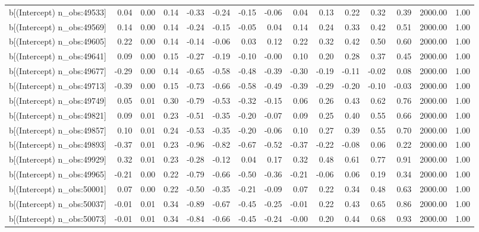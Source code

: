 \begin{table}[ht]
\begin{tabular}{rrrrrrrrrrrrrrr}
  b[(Intercept) n\_obs:49533] & 0.04 & 0.00 & 0.14 & -0.33 & -0.24 & -0.15 & -0.06 & 0.04 & 0.13 & 0.22 & 0.32 & 0.39 & 2000.00 & 1.00 \\ 
  b[(Intercept) n\_obs:49569] & 0.14 & 0.00 & 0.14 & -0.24 & -0.15 & -0.05 & 0.04 & 0.14 & 0.24 & 0.33 & 0.42 & 0.51 & 2000.00 & 1.00 \\ 
  b[(Intercept) n\_obs:49605] & 0.22 & 0.00 & 0.14 & -0.14 & -0.06 & 0.03 & 0.12 & 0.22 & 0.32 & 0.42 & 0.50 & 0.60 & 2000.00 & 1.00 \\ 
  b[(Intercept) n\_obs:49641] & 0.09 & 0.00 & 0.15 & -0.27 & -0.19 & -0.10 & -0.00 & 0.10 & 0.20 & 0.28 & 0.37 & 0.45 & 2000.00 & 1.00 \\ 
  b[(Intercept) n\_obs:49677] & -0.29 & 0.00 & 0.14 & -0.65 & -0.58 & -0.48 & -0.39 & -0.30 & -0.19 & -0.11 & -0.02 & 0.08 & 2000.00 & 1.00 \\ 
  b[(Intercept) n\_obs:49713] & -0.39 & 0.00 & 0.15 & -0.73 & -0.66 & -0.58 & -0.49 & -0.39 & -0.29 & -0.20 & -0.10 & -0.03 & 2000.00 & 1.00 \\ 
  b[(Intercept) n\_obs:49749] & 0.05 & 0.01 & 0.30 & -0.79 & -0.53 & -0.32 & -0.15 & 0.06 & 0.26 & 0.43 & 0.62 & 0.76 & 2000.00 & 1.00 \\ 
  b[(Intercept) n\_obs:49821] & 0.09 & 0.01 & 0.23 & -0.51 & -0.35 & -0.20 & -0.07 & 0.09 & 0.25 & 0.40 & 0.55 & 0.66 & 2000.00 & 1.00 \\ 
  b[(Intercept) n\_obs:49857] & 0.10 & 0.01 & 0.24 & -0.53 & -0.35 & -0.20 & -0.06 & 0.10 & 0.27 & 0.39 & 0.55 & 0.70 & 2000.00 & 1.00 \\ 
  b[(Intercept) n\_obs:49893] & -0.37 & 0.01 & 0.23 & -0.96 & -0.82 & -0.67 & -0.52 & -0.37 & -0.22 & -0.08 & 0.06 & 0.22 & 2000.00 & 1.00 \\ 
  b[(Intercept) n\_obs:49929] & 0.32 & 0.01 & 0.23 & -0.28 & -0.12 & 0.04 & 0.17 & 0.32 & 0.48 & 0.61 & 0.77 & 0.91 & 2000.00 & 1.00 \\ 
  b[(Intercept) n\_obs:49965] & -0.21 & 0.00 & 0.22 & -0.79 & -0.66 & -0.50 & -0.36 & -0.21 & -0.06 & 0.06 & 0.19 & 0.34 & 2000.00 & 1.00 \\ 
  b[(Intercept) n\_obs:50001] & 0.07 & 0.00 & 0.22 & -0.50 & -0.35 & -0.21 & -0.09 & 0.07 & 0.22 & 0.34 & 0.48 & 0.63 & 2000.00 & 1.00 \\ 
  b[(Intercept) n\_obs:50037] & -0.01 & 0.01 & 0.34 & -0.89 & -0.67 & -0.45 & -0.25 & -0.01 & 0.22 & 0.43 & 0.65 & 0.86 & 2000.00 & 1.00 \\ 
  b[(Intercept) n\_obs:50073] & -0.01 & 0.01 & 0.34 & -0.84 & -0.66 & -0.45 & -0.24 & -0.00 & 0.20 & 0.44 & 0.68 & 0.93 & 2000.00 & 1.00 \\ 

\end{tabular}
\end{table}
